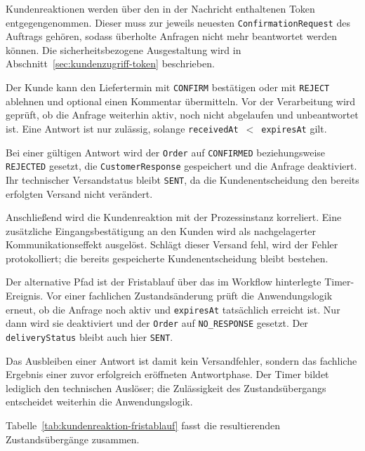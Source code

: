 \documentclass[
  12pt,
  a4paper,
  oneside
]{article}
\begin{document}
Kundenreaktionen werden über den in der Nachricht enthaltenen Token
entgegengenommen. Dieser muss zur jeweils neuesten
\texttt{ConfirmationRequest} des Auftrags gehören, sodass überholte Anfragen
nicht mehr beantwortet werden können. Die sicherheitsbezogene Ausgestaltung
wird in Abschnitt~\ref{sec:kundenzugriff-token} beschrieben.

Der Kunde kann den Liefertermin mit \texttt{CONFIRM} bestätigen oder mit
\texttt{REJECT} ablehnen und optional einen Kommentar übermitteln. Vor der
Verarbeitung wird geprüft, ob die Anfrage weiterhin aktiv, noch nicht
abgelaufen und unbeantwortet ist. Eine Antwort ist nur zulässig, solange
\texttt{receivedAt}~$<$~\texttt{expiresAt} gilt.

Bei einer gültigen Antwort wird der \texttt{Order} auf
\texttt{CONFIRMED} beziehungsweise \texttt{REJECTED} gesetzt, die
\texttt{CustomerResponse} gespeichert und die Anfrage deaktiviert. Ihr
technischer Versandstatus bleibt \texttt{SENT}, da die Kundenentscheidung den
bereits erfolgten Versand nicht verändert.

Anschließend wird die Kundenreaktion mit der Prozessinstanz korreliert. Eine
zusätzliche Eingangsbestätigung an den Kunden wird als nachgelagerter
Kommunikationseffekt ausgelöst. Schlägt dieser Versand fehl, wird der Fehler
protokolliert; die bereits gespeicherte Kundenentscheidung bleibt bestehen.

Der alternative Pfad ist der Fristablauf über das im Workflow hinterlegte
Timer-Ereignis. Vor einer fachlichen Zustandsänderung prüft die
Anwendungslogik erneut, ob die Anfrage noch aktiv und
\texttt{expiresAt} tatsächlich erreicht ist. Nur dann wird sie deaktiviert und
der \texttt{Order} auf \texttt{NO\_RESPONSE} gesetzt. Der
\texttt{deliveryStatus} bleibt auch hier \texttt{SENT}.

Das Ausbleiben einer Antwort ist damit kein Versandfehler, sondern das
fachliche Ergebnis einer zuvor erfolgreich eröffneten Antwortphase. Der Timer
bildet lediglich den technischen Auslöser; die Zulässigkeit des
Zustandsübergangs entscheidet weiterhin die Anwendungslogik.

Tabelle~\ref{tab:kundenreaktion-fristablauf} fasst die resultierenden
Zustandsübergänge zusammen.
\end{document}
